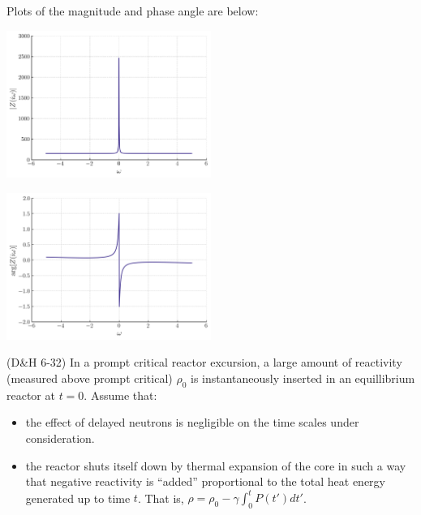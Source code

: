 \documentclass[11pt,addpoints,answers]{exam}
\begin{document}
\begin{questions}
\begin{solution}
                    Plots of the magnitude and phase angle are below:

                    \begin{center}
                        \centering
                        \includegraphics[width=0.5\textwidth]{figs/magnitude.png}
                    \end{center}
                    \begin{center}
                        \centering
                        \includegraphics[width=0.5\textwidth]{figs/phase.png}
                    \end{center}



                \end{solution}
       
        \question[10] (D\&H 6-32) In a prompt critical reactor excursion, a 
        large amount of reactivity (measured above prompt critical) $\rho_0$ is 
        instantaneously inserted in an equillibrium reactor at $t=0$. Assume 
        that:
        \begin{itemize}
                \item the effect of delayed neutrons is negligible on the time 
                        scales under consideration.
                \item the reactor shuts itself down by thermal expansion of the 
                        core in such a way that negative reactivity is 
                        ``added'' proportional to the total heat energy 
                        generated up to time $t$. That is, $\rho = \rho_0 - 
                        \gamma\int_0^t{P(t')dt'}$. 
        \end{itemize}


\end{questions}
\end{document}
